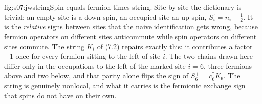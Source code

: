 %
\begin{aqmfigure}{fig:s07:jwstring}{Spin equals fermion times string. Site by site the dictionary is
trivial: an empty site is a down spin, an occupied site an up spin, $S^z_i = n_i - \tfrac12$. It is
the \emph{relative} signs between sites that the naive identification gets wrong, because fermion
operators on different sites anticommute while spin operators on different sites commute. The string
$K_i$ of (7.2) repairs exactly this: it contributes a factor $-1$ once for every fermion sitting to
the left of site $i$. The two chains drawn here differ only in the occupations to the left of the
marked site $i=6$, three fermions above and two below, and that parity alone flips the sign of
$S_6^+ = c_6^\dagger K_6$. The string is genuinely nonlocal, and what it carries is the fermionic
exchange sign that spins do not have on their own.}

\end{aqmfigure}
